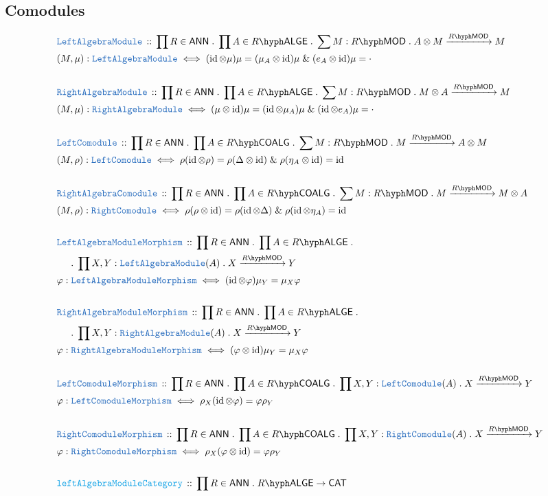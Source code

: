 \documentclass[12pt]{scrartcl}%
\newcommand{\TYPE}[1]{\textcolor{NavyBlue}{\mathtt{#1}}}%
\newcommand{\FUNC}[1]{\textcolor{Cerulean}{\mathtt{#1}}}%
\renewcommand{\.}{\; . \;} %
\newcommand{\DeclareType}[2]{& \TYPE{#1} \, :: \, #2 \\}%
\newcommand{\DefineType}[3]{& #1 : \TYPE{#2} \iff #3 \\}%
\newcommand{\DeclareFunc}[2]{& \FUNC{#1} \, :: \, #2 \\}%
\newcommand{\NewLine}{\\ & \kern 1pc}%
\newcommand{\Page}[1]{ \begin{align*} #1 \end{align*}  }%
\renewcommand{\And}{\; \& \;}%
\DeclareMathOperator*{\id}{id}%
\newcommand{\Arrow}[1]{\xrightarrow{#1}}%
\newcommand{\CAT}{\mathsf{CAT}} %
\newcommand{\LMOD}[1]{#1\hyph\mathsf{MOD}} %
\newcommand{\ANN}{\mathsf{ANN}} %
\newcommand{\LALGE}[1]{#1\hyph\mathsf{ALGE}}%
\newcommand{\COALG}[1]{#1\hyph\mathsf{COALG}}%
\begin{document}
\subsection{Comodules}
\Page{
	\DeclareType{LeftAlgebraModule}{\prod R \in \ANN \. \prod A \in \LALGE{R} \. \sum M : \LMOD{R} \. A \otimes M \Arrow{\LMOD{R}} M } 
	\DefineType{(M,\mu)}{LeftAlgebraModule}{   (\id \otimes \mu)\mu = (\mu_A \otimes \id)\mu  \And (e_A \otimes \id)\mu = \cdot}
	\\
	\DeclareType{RightAlgebraModule}{\prod R \in \ANN \. \prod A \in \LALGE{R} \. \sum M : \LMOD{R} \. M \otimes A \Arrow{\LMOD{R}} M } 
	\DefineType{(M,\mu)}{RightAlgebraModule}{   (\mu \otimes \id)\mu = (\id \otimes \mu_A)\mu \And (\id \otimes e_A)\mu = \cdot }
	\\
	\DeclareType{LeftComodule}{\prod R \in \ANN \. \prod A \in \COALG{R} \. \sum M : \LMOD{R} \. M \Arrow{\LMOD{R}} A \otimes M } 
	\DefineType{(M,\rho)}{LeftComodule}{   \rho(\id \otimes \rho) = \rho(\Delta \otimes \id) \And  \rho ( \eta_A \otimes \id) = \id   }
	\\
	\DeclareType{RightAlgebraComodule}{\prod R \in \ANN \. \prod A \in \COALG{R} \. \sum M : \LMOD{R} \. M \Arrow{\LMOD{R}} M \otimes A } 
	\DefineType{(M,\rho)}{RightComodule}{ \rho (\rho \otimes \id) = \rho (\id \otimes \Delta) \And \rho (\id \otimes \eta_A) = \id}
	\\
	\DeclareType{LeftAlgebraModuleMorphism}{\prod R \in \ANN \. \prod A \in \LALGE{R} \. \NewLine \. \prod X,Y : \TYPE{LeftAlgebraModule}(A) \. X \Arrow{\LMOD{R}} Y } 
	\DefineType{\varphi}{LeftAlgebraModuleMorphism}{   (\id \otimes \varphi)\mu_Y = \mu_X \varphi }
	\\
	\DeclareType{RightAlgebraModuleMorphism}{\prod R \in \ANN \. \prod A \in \LALGE{R} \. \NewLine \. \prod X,Y : \TYPE{RightAlgebraModule}(A) \. X \Arrow{\LMOD{R}} Y } 
	\DefineType{\varphi}{RightAlgebraModuleMorphism}{   (\varphi \otimes \id)\mu_Y = \mu_X \varphi }
	\\
	\DeclareType{LeftComoduleMorphism}{\prod R \in \ANN \. \prod A \in \COALG{R} \. \prod X,Y : \TYPE{LeftComodule}(A) \. X \Arrow{\LMOD{R}} Y } 
	\DefineType{\varphi}{LeftComoduleMorphism}{  \rho_X(\id \otimes \varphi) =  \varphi \rho_Y }
	\\
	\DeclareType{RightComoduleMorphism}{\prod R \in \ANN \. \prod A \in \COALG{R} \. \prod X,Y : \TYPE{RightComodule}(A) \. X \Arrow{\LMOD{R}} Y } 
	\DefineType{\varphi}{RightComoduleMorphism}{  \rho_X (\varphi \otimes \id) =  \varphi \rho_Y }
	\\
	\DeclareFunc{leftAlgebraModuleCategory}{\prod R \in \ANN \. \LALGE{R} \to \CAT}
}
\end{document}
